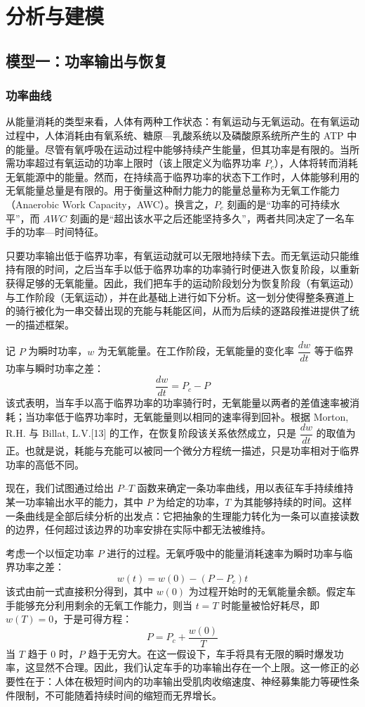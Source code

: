 \documentclass[11pt,a4paper]{ctexart}
\begin{document}
\section{分析与建模}

\subsection{模型一：功率输出与恢复}

\subsubsection{功率曲线}

从能量消耗的类型来看，人体有两种工作状态：有氧运动与无氧运动。在有氧运动过程中，人体消耗由有氧系统、糖原—乳酸系统以及磷酸原系统所产生的 ATP 中的能量。尽管有氧呼吸在运动过程中能够持续产生能量，但其功率是有限的。当所需功率超过有氧运动的功率上限时（该上限定义为临界功率 $P_c$），人体将转而消耗无氧能源中的能量。然而，在持续高于临界功率的状态下工作时，人体能够利用的无氧能量总量是有限的。用于衡量这种耐力能力的能量总量称为无氧工作能力（Anaerobic Work Capacity，AWC）。换言之，$P_c$ 刻画的是“功率的可持续水平”，而 $AWC$ 刻画的是“超出该水平之后还能坚持多久”，两者共同决定了一名车手的功率—时间特征。

只要功率输出低于临界功率，有氧运动就可以无限地持续下去。而无氧运动只能维持有限的时间，之后当车手以低于临界功率的功率骑行时便进入恢复阶段，以重新获得足够的无氧能量。因此，我们把车手的运动阶段划分为恢复阶段（有氧运动）与工作阶段（无氧运动），并在此基础上进行如下分析。这一划分使得整条赛道上的骑行被化为一串交替出现的充能与耗能区间，从而为后续的逐路段推进提供了统一的描述框架。

记 $P$ 为瞬时功率，$w$ 为无氧能量。在工作阶段，无氧能量的变化率 $\dfrac{dw}{dt}$ 等于临界功率与瞬时功率之差：
\[
\frac{dw}{dt}=P_c-P
\]
该式表明，当车手以高于临界功率的功率骑行时，无氧能量以两者的差值速率被消耗；当功率低于临界功率时，无氧能量则以相同的速率得到回补。根据 Morton, R.H. 与 Billat, L.V.[13] 的工作，在恢复阶段该关系依然成立，只是 $\dfrac{dw}{dt}$ 的取值为正。也就是说，耗能与充能可以被同一个微分方程统一描述，只是功率相对于临界功率的高低不同。

现在，我们试图通过给出 $P$--$T$ 函数来确定一条功率曲线，用以表征车手持续维持某一功率输出水平的能力，其中 $P$ 为给定的功率，$T$ 为其能够持续的时间。这样一条曲线是全部后续分析的出发点：它把抽象的生理能力转化为一条可以直接读数的边界，任何超过该边界的功率安排在实际中都无法被维持。

考虑一个以恒定功率 $P$ 进行的过程。无氧呼吸中的能量消耗速率为瞬时功率与临界功率之差：
\[
w(t)=w(0)-(P-P_c)t
\]
该式由前一式直接积分得到，其中 $w(0)$ 为过程开始时的无氧能量余额。假定车手能够充分利用剩余的无氧工作能力，则当 $t=T$ 时能量被恰好耗尽，即 $w(T)=0$，于是可得方程：
\[
P=P_c+\frac{w(0)}{T}
\]
当 $T$ 趋于 0 时，$P$ 趋于无穷大。在这一假设下，车手将具有无限的瞬时爆发功率，这显然不合理。因此，我们认定车手的功率输出存在一个上限。这一修正的必要性在于：人体在极短时间内的功率输出受肌肉收缩速度、神经募集能力等硬性条件限制，不可能随着持续时间的缩短而无界增长。
\end{document}
